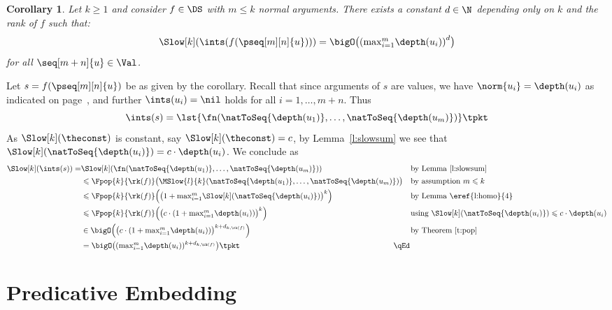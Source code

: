 \documentclass{LMCS}
\newtheorem{corollary}[thm]{Corollary}
\begin{document}
\begin{corollary}\label{c:pop}
  Let $k \geqslant 1$ and consider 
  $f \in \DS$ with $m \leqslant k$ normal arguments.
There exists a constant $d \in \N$ depending only on $k$ and 
  the rank of $f$ such that:
  $$\Slow[k](\ints(f(\pseq[m][n]{u}))) = \bigO\bigl({(\textstyle{\max}_{i=1}^m \depth(u_i))}^{d}\bigr)$$
  for all $\seq[m+n]{u} \in \Val$.
\end{corollary}
\proof
  Let $s = f(\pseq[m][n]{u})$ be as given by the corollary. 
  Recall that since arguments of $s$ are values, we have $\norm{u_i} = \depth(u_i)$ as indicated on page~\pageref{d:normonval}, 
  and further $\ints(u_i) = \nil$ holds for all $i = 1,\dots,m+n$.
  Thus
  \begin{equation*}
    \ints(s) = \lst{\fn(\natToSeq{\depth(u_1)}, \dots, \natToSeq{\depth(u_m)})} \tpkt
  \end{equation*}
As $\Slow[k](\theconst)$ is constant, say $\Slow[k](\theconst) = c$, by Lemma~\ref{l:slowsum} we see that
  $\Slow[k](\natToSeq{\depth(u_i)}) = c \cdot \depth(u_i)$. 
We conclude as
  \begin{align*}
    \Slow[k](\ints(s)) =
    & \Slow[k](\fn(\natToSeq{\depth(u_1)}, \dots, \natToSeq{\depth(u_m)})) 
    && \text{by Lemma~\ref{l:slowsum}} 
    \\
    & \leqslant \Fpop{k}{\rk(f)}\bigl(\MSlow{l}{k}(\natToSeq{\depth(u_1)}, \dots, \natToSeq{\depth(u_m)})\bigr) 
    && \text{by assumption $m \leqslant k$}
    \\
    & \leqslant \Fpop{k}{\rk(f)}\Bigl({\bigl(1+ \textstyle{\max}_{i=1}^m \Slow[k](\natToSeq{\depth(u_i)})\bigr)}^k\Bigr) 
    && \text{by Lemma~\eref{l:homo}{4}} 
    \\
    & \leqslant \Fpop{k}{\rk(f)}\Bigl({\bigl(c \cdot (1 + \textstyle{\max}_{i=1}^m \depth(u_i))\bigr)}^k\Bigr)
    && \text{using $\Slow[k](\natToSeq{\depth(u_i)}) \leqslant c \cdot \depth(u_i)$}
    \\
    & \in \bigO\Bigl({\bigl(c \cdot (1 + \textstyle{\max}_{i=1}^m \depth(u_i))\bigr)}^{k+{d_{k,\rk(f)}}}\Bigr)
    && \text{by Theorem~\ref{t:pop}} 
    \\
    & = \bigO\bigl(({\textstyle{\max}_{i=1}^m \depth(u_i)})^{k+d_{k,\rk(f)}}\bigr) \tpkt
    \rlap{\hbox to 217 pt{\hfill\qEd}}
  \end{align*}



\section{Predicative Embedding}\label{s:embed}
\end{document}
